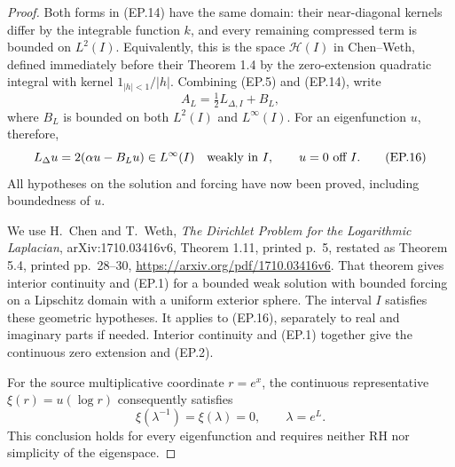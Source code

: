 \begin{proof}
Both forms in (EP.14) have the same domain:
their near-diagonal kernels differ by the integrable
function \(k\), and every remaining compressed term is
bounded on \(L^2(I)\).  Equivalently, this is the space
\(\mathcal H(I)\) in Chen--Weth, defined immediately
before their Theorem 1.4 by the zero-extension
quadratic integral with kernel
\(1_{|h|<1}/|h|\).
Combining (EP.5) and (EP.14), write
\[
                         A_L=\tfrac12L_{\Delta,I}+B_L,
                                                        \tag{EP.15}
\]
where \(B_L\) is bounded on both \(L^2(I)\) and
\(L^\infty(I)\).
For an eigenfunction \(u\), therefore,
\[
       L_\Delta u=2(\alpha u-B_Lu)\in L^\infty(I)
       \quad\hbox{weakly in }I,\qquad u=0\text{ off }I.
                                                        \tag{EP.16}
\]
All hypotheses on the solution and forcing have now
been proved, including boundedness of \(u\).

We use H.~Chen and T.~Weth,
\emph{The Dirichlet Problem for the Logarithmic Laplacian},
arXiv:1710.03416v6, Theorem 1.11, printed p.~5,
restated as Theorem 5.4, printed pp.~28--30,
\url{https://arxiv.org/pdf/1710.03416v6}.
That theorem gives interior continuity and (EP.1)
for a bounded weak solution with bounded forcing
on a Lipschitz domain with a uniform exterior sphere.
The interval \(I\) satisfies these geometric hypotheses.
It applies to (EP.16), separately to real and imaginary
parts if needed.
Interior continuity and (EP.1) together give the
continuous zero extension and (EP.2).

For the source multiplicative coordinate \(r=e^x\),
the continuous representative
\(\xi(r)=u(\log r)\) consequently satisfies
\[
                     \xi(\lambda^{-1})=\xi(\lambda)=0,
                     \qquad \lambda=e^L.              \tag{EP.17}
\]
This conclusion holds for every eigenfunction and
requires neither RH nor simplicity of the eigenspace.
\end{proof}

